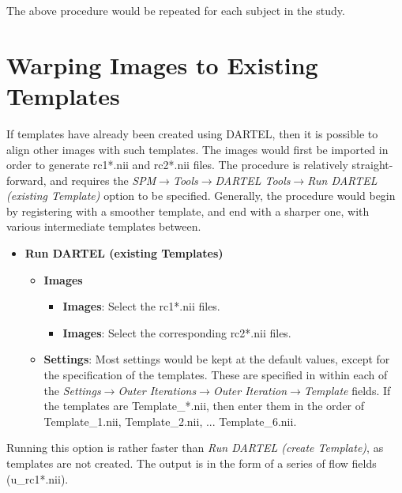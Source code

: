 The above procedure would be repeated for each subject in the study.

\section{Warping Images to Existing Templates}
If templates have already been created using DARTEL, then it is possible to align other images with such templates.
The images would first be imported in order to generate rc1*.nii and rc2*.nii files.
The procedure is relatively straight-forward, and requires the \emph{SPM$\rightarrow$Tools$\rightarrow$DARTEL Tools$\rightarrow$Run DARTEL (existing Template)} option to be specified.
Generally, the procedure would begin by registering with a smoother template, and end with a sharper one, with various intermediate templates between.
\begin{itemize}
\item{{\bf Run DARTEL (existing Templates)}
  \begin{itemize}
  \item{{\bf Images}
    \begin{itemize}
    \item{{\bf Images}: Select the rc1*.nii files.}
    \item{{\bf Images}: Select the corresponding rc2*.nii files.}
    \end{itemize}
  }
  \item{{\bf Settings}: Most settings would be kept at the default values, except for the specification of the templates.
These are specified in within each of the \emph{Settings$\rightarrow$Outer Iterations$\rightarrow$Outer Iteration$\rightarrow$Template} fields.
If the templates are Template\_*.nii, then enter them in the order of Template\_1.nii, Template\_2.nii, ... Template\_6.nii.
  }
  \end{itemize}
}
\end{itemize}

Running this option is rather faster than \emph{Run DARTEL (create Template)}, as templates are not created.
The output is in the form of a series of flow fields (u\_rc1*.nii).

